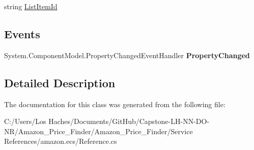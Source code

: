 \begin{DoxyCompactItemize}
\begin{DoxyCompactList}\small\item\em \end{DoxyCompactList}\item 
\hypertarget{class_amazon___price___finder_1_1amazon_1_1ecs_1_1_cart_add_request_item_a7b947c8a3ffdcf656d070de3eda16bfb}{string \hyperlink{class_amazon___price___finder_1_1amazon_1_1ecs_1_1_cart_add_request_item_a7b947c8a3ffdcf656d070de3eda16bfb}{List\-Item\-Id}}\label{class_amazon___price___finder_1_1amazon_1_1ecs_1_1_cart_add_request_item_a7b947c8a3ffdcf656d070de3eda16bfb}

\begin{DoxyCompactList}\small\item\em \end{DoxyCompactList}\end{DoxyCompactItemize}
\subsection*{Events}
\begin{DoxyCompactItemize}
\item 
\hypertarget{class_amazon___price___finder_1_1amazon_1_1ecs_1_1_cart_add_request_item_ac6d904cff37ed94a8aadbf0cee3e50ec}{System.\-Component\-Model.\-Property\-Changed\-Event\-Handler {\bfseries Property\-Changed}}\label{class_amazon___price___finder_1_1amazon_1_1ecs_1_1_cart_add_request_item_ac6d904cff37ed94a8aadbf0cee3e50ec}

\end{DoxyCompactItemize}


\subsection{Detailed Description}


The documentation for this class was generated from the following file\-:\begin{DoxyCompactItemize}
\item 
C\-:/\-Users/\-Los Haches/\-Documents/\-Git\-Hub/\-Capstone-\/\-L\-H-\/\-N\-N-\/\-D\-O-\/\-N\-R/\-Amazon\-\_\-\-Price\-\_\-\-Finder/\-Amazon\-\_\-\-Price\-\_\-\-Finder/\-Service References/amazon.\-ecs/Reference.\-cs\end{DoxyCompactItemize}
